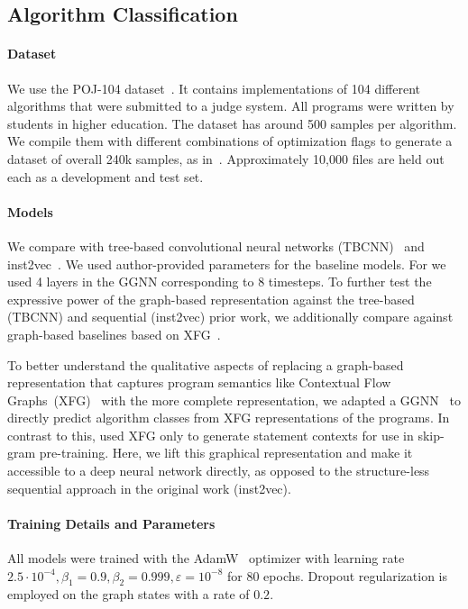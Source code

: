 \subsection{Algorithm Classification}
\label{app:classifyapp_details}

\paragraph{Dataset} We use the POJ-104 dataset~\citep{Mou2016}. It contains
implementations of 104 different algorithms that were submitted to a judge
system. All programs were written by students in higher education. The dataset
has around 500 samples per algorithm. We compile them with different
combinations of optimization flags to generate a dataset of overall 240k
samples, as in~\citet{Ben-nun2018}. Approximately 10,000 files are held out each
as a development and test set.

\paragraph{Models} We compare with tree-based convolutional neural networks
(TBCNN)~\citep{Mou2016} and inst2vec~\citep{Ben-nun2018}. We used
author-provided parameters for the baseline models. For \programl we used 4
layers in the GGNN corresponding to 8 timesteps. To further test the expressive
power of the graph-based representation against the tree-based (TBCNN) and
sequential (inst2vec) prior work, we additionally compare against graph-based
baselines based on XFG~\citep{Ben-nun2018}.

To better understand the qualitative aspects of replacing a graph-based
representation that captures program semantics like Contextual Flow
Graphs~(XFG)~\citep{Ben-nun2018} with the more complete \programl
representation, we adapted a GGNN~\citep{Li2015a} to directly predict algorithm
classes from XFG representations of the programs. In contrast to this,
\citet{Ben-nun2018} used XFG only to generate statement contexts for use in
skip-gram pre-training. Here, we lift this graphical representation and make it
accessible to a deep neural network directly, as opposed to the structure-less
sequential approach in the original work (inst2vec).


\paragraph{Training Details and Parameters}

All models were trained with the AdamW~\citep{Loshchilov2019} optimizer with
learning rate $2.5\cdot 10^{-4}, \beta_1=0.9, \beta_2=0.999,
\varepsilon=10^{-8}$ for 80 epochs. Dropout regularization is employed on the
graph states with a rate of $0.2$.
